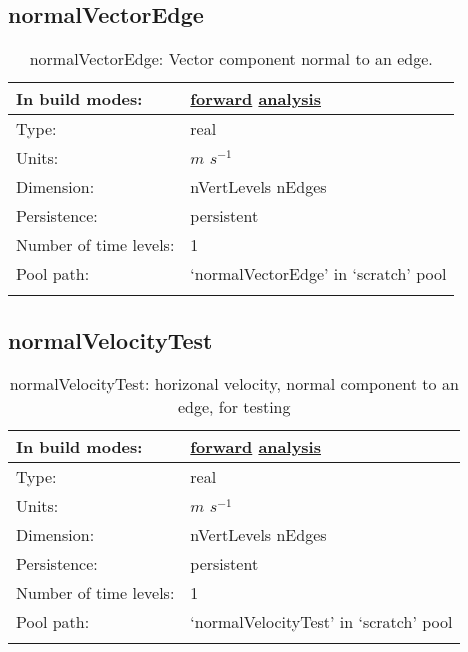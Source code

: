 \subsection[normalVectorEdge]{normalVectorEdge}
\label{subsec:var_sec_scratch_normalVectorEdge}
\begin{center}
\begin{longtable}{| p{2.0in} | p{4.0in} |}
        \hline 
        In build modes: & \hyperref[subsec:forward_var_tab_scratch]{forward} \hyperref[subsec:analysis_var_tab_scratch]{analysis} \\
        \hline 
        Type: & real \\
        \hline 
        Units: & $m$ $s^{-1}$ \\
        \hline 
        Dimension: & nVertLevels nEdges \\
        \hline 
        Persistence: & persistent \\
        \hline 
        Number of time levels: & 1 \\
        \hline 
            Pool path: & `normalVectorEdge' in `scratch' pool \\
		 \hline 
    \caption{normalVectorEdge: Vector component normal to an edge.}
\end{longtable}
\end{center}
\subsection[normalVelocityTest]{normalVelocityTest}
\label{subsec:var_sec_scratch_normalVelocityTest}
\begin{center}
\begin{longtable}{| p{2.0in} | p{4.0in} |}
        \hline 
        In build modes: & \hyperref[subsec:forward_var_tab_scratch]{forward} \hyperref[subsec:analysis_var_tab_scratch]{analysis} \\
        \hline 
        Type: & real \\
        \hline 
        Units: & $m$ $s^{-1}$ \\
        \hline 
        Dimension: & nVertLevels nEdges \\
        \hline 
        Persistence: & persistent \\
        \hline 
        Number of time levels: & 1 \\
        \hline 
            Pool path: & `normalVelocityTest' in `scratch' pool \\
		 \hline 
    \caption{normalVelocityTest: horizonal velocity, normal component to an edge, for testing}
\end{longtable}
\end{center}
